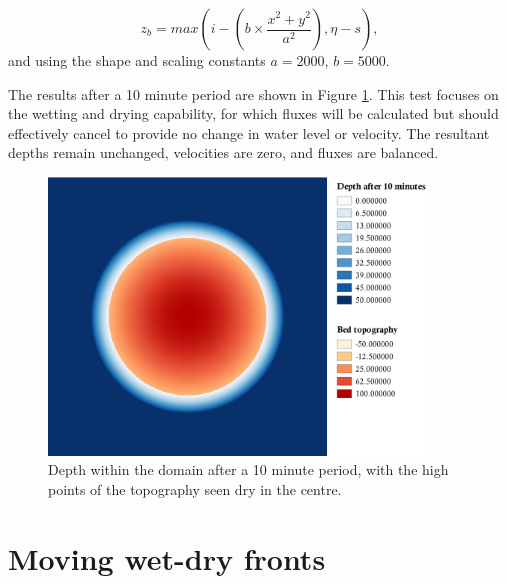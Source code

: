 \begin{equation}
\label{Test_WellBalanced_Conditions}
z_b = max \left( i - \left( b \times \frac{x^2 + y^2}{a^2} \right), \eta - s \right)
,
\end{equation}
and using the shape and scaling constants $a = 2000$, $b = 5000$.

The results after a 10 minute period are shown in Figure \ref{TestResult_WellBalanced}. This test focuses on the wetting and drying capability, for which fluxes will be calculated but should effectively cancel to provide no change in water level or velocity. The resultant depths remain unchanged, velocities are zero, and fluxes are balanced.

\begin{figure}[tpb]
	\centering
	\includegraphics[width=0.9\textwidth]{numerical-test-figures/well-balanced-10mins.png}
	\caption{Depth within the domain after a 10 minute period, with the high points of the topography seen dry in the centre.}
	\label{TestResult_WellBalanced}
\end{figure}

\section{Moving wet-dry fronts}

